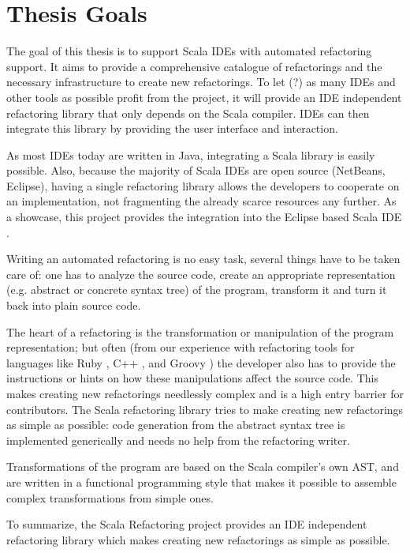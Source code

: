\documentclass[10pt,a4paper,oneside]{scrreprt}
\begin{document}
\section{Thesis Goals}

The goal of this thesis is to support Scala IDEs with automated refactoring support. It aims to provide a comprehensive catalogue of refactorings and the necessary infrastructure to create new refactorings. To let (?) as many IDEs and other tools as possible profit from the project, it will provide an IDE independent refactoring library that only depends on the Scala compiler. IDEs can then integrate this library by providing the user interface and interaction.

As most IDEs today are written in Java, integrating a Scala library is easily possible. Also, because the majority of Scala IDEs are open source (NetBeans, Eclipse), having a single refactoring library allows the developers to cooperate on an implementation, not fragmenting the already scarce resources any further. As a showcase, this project provides the integration into the Eclipse based Scala IDE \cite{EclipseScalaIDE}.

Writing an automated refactoring is no easy task, several things have to be taken care of: one has to analyze the source code, create an appropriate representation (e.g. abstract or concrete syntax tree) of the program, transform it and turn it back into plain source code. 

The heart of a refactoring is the transformation or manipulation of the program representation; but often (from our experience with refactoring tools for languages like Ruby \cite{RubyRefactoring}, C++ \cite{CdtOopsla}, and Groovy \cite{GroovyOopsla}) the developer also has to provide the instructions or hints on how these manipulations affect the source code. This makes creating new refactorings needlessly complex and is a high entry barrier for contributors. The Scala refactoring library tries to make creating new refactorings as simple as possible: code generation from the abstract syntax tree is implemented generically and needs no help from the refactoring writer.

Transformations of the program are based on the Scala compiler's own AST, and are written in a functional programming style that makes it possible to assemble complex transformations from simple ones.

To summarize, the Scala Refactoring project provides an IDE independent refactoring library which makes creating new refactorings as simple as possible.
\end{document}
